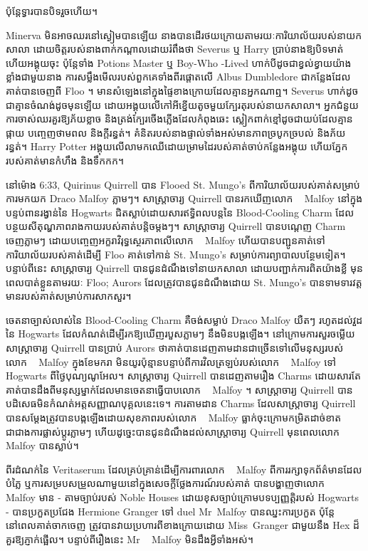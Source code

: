 {ប៉ុន្តែទ្វារបានបិទរួចហើយ។

\later

Minerva មិនអាចឈរនៅស្ងៀមបានឡើយ នាងបានដើរថយក្រោយតាមរយៈការិយាល័យរបស់នាយកសាលា ដោយចិត្តរបស់នាងពាក់កណ្តាលដោយរំពឹងថា Severus ឬ Harry ប្រាប់នាងឱ្យបិទមាត់ហើយអង្គុយចុះ ប៉ុន្តែទាំង Potions Master ឬ Boy-Who -Lived ហាក់បីដូចជាខ្វល់ខ្វាយយ៉ាងខ្លាំងជាមួយនាង ការសម្លឹងមើលរបស់ពួកគេទាំងពីរផ្តោតលើ Albus Dumbledore ជាកន្លែងដែលគាត់បានចេញពី Floo ។ មាន​សំឡេង​នៅ​ក្នុង​ផ្ទៃ​ខាងក្រោយ​ដែល​គ្មាន​អ្នក​ណា​ឮ។ Severus ហាក់​ដូច​ជា​គ្មាន​ចំណង់​ដូច​មុន​ឡើយ ដោយ​អង្គុយ​លើ​កៅអី​ខ្នើយ​តូច​មួយ​ក្បែរ​តុ​របស់​នាយក​សាលា។ អ្នកជំនួយការចាស់ឈរគួរឱ្យភ័យខ្លាច និងត្រង់ក្បែរចើងភ្លើងដែលកំពុងឆេះ ស្លៀកពាក់ខ្មៅដូចជាយប់ដែលគ្មានផ្កាយ បញ្ចេញថាមពល និងក្តីរន្ធត់។ គំនិត​របស់​នាង​ផ្ទាល់​ទាំង​អស់​មាន​ភាព​ច្របូកច្របល់ និង​ភ័យ​រន្ធត់។ Harry Potter អង្គុយលើលាមកឈើដោយម្រាមដៃរបស់គាត់ចាប់កន្លែងអង្គុយ ហើយភ្នែករបស់គាត់មានកំហឹង និងទឹកកក។

នៅម៉ោង 6:33\am, Quirinus Quirrell បាន Flooed St. Mungo's ពីការិយាល័យរបស់គាត់សម្រាប់ការមកយក Draco Malfoy ភ្លាមៗ។ សាស្ត្រាចារ្យ Quirrell បានរកឃើញលោក ~ Malfoy នៅក្នុងបន្ទប់ពានរង្វាន់នៃ Hogwarts ជិតស្លាប់ដោយសារឥទ្ធិពលបន្តនៃ Blood-Cooling Charm ដែលបន្ថយសីតុណ្ហភាពរាងកាយរបស់គាត់បន្តិចម្តងៗ។ សាស្ត្រាចារ្យ Quirrell បានបណ្តេញ Charm ចេញភ្លាមៗ ដោយបញ្ចេញអក្ខរាវិរុទ្ធស្ថេរភាពលើលោក ~ Malfoy ហើយបានបញ្ជូនគាត់ទៅការិយាល័យរបស់គាត់ដើម្បី Floo គាត់ទៅកាន់ St. Mungo's សម្រាប់ការព្យាបាលបន្ថែមទៀត។ បន្ទាប់ពីនេះ សាស្រ្តាចារ្យ Quirrell បានជូនដំណឹងទៅនាយកសាលា ដោយបញ្ជាក់ការពិតយ៉ាងខ្លី មុនពេលបាត់ខ្លួនតាមរយៈ Floo; Aurors ដែលត្រូវបានជូនដំណឹងដោយ St. Mungo's បានទាមទារវត្តមានរបស់គាត់សម្រាប់ការសាកសួរ។

ចេតនាច្បាស់លាស់នៃ Blood-Cooling Charm គឺចង់សម្លាប់ Draco Malfoy យឺតៗ រហូតដល់វួដនៃ Hogwarts ដែលកំណត់ដើម្បីរកឱ្យឃើញរបួសភ្លាមៗ នឹងមិនបង្កឡើង។ នៅក្រោមការសួរចម្លើយ សាស្រ្តាចារ្យ Quirrell បានប្រាប់ Aurors ថាគាត់បានដេញតាមដានជាច្រើនទៅលើមនុស្សរបស់លោក ~ Malfoy ក្នុងខែមករា មិនយូរប៉ុន្មានបន្ទាប់ពីការវិលត្រឡប់របស់លោក ~ Malfoy ទៅ Hogwarts ពីថ្ងៃបុណ្យណូអែល។ សាស្រ្តាចារ្យ Quirrell បានដេញតាមរឿង Charms ដោយសារតែគាត់បានដឹងពីមនុស្សម្នាក់ដែលមានចេតនាធ្វើបាបលោក ~ Malfoy ។ សាស្ត្រាចារ្យ Quirrell បានបដិសេធមិនកំណត់អត្តសញ្ញាណបុគ្គលនេះទេ។ ការតាមដាន Charms ដែលសាស្រ្តាចារ្យ Quirrell បានសម្ដែងត្រូវបានបង្កឡើងដោយសុខភាពរបស់លោក ~ Malfoy ធ្លាក់ចុះក្រោមកម្រិតដាច់ខាត ជាជាងការផ្លាស់ប្តូរភ្លាមៗ ហើយដូច្នេះបានជូនដំណឹងដល់សាស្រ្តាចារ្យ Quirrell មុនពេលលោក ~ Malfoy បានស្លាប់។

ពីរដំណក់នៃ Veritaserum ដែលគ្រប់គ្រាន់ដើម្បីការពារលោក ~ Malfoy ពីការរក្សាទុកព័ត៌មានដែលបំភ្លៃ ឬការសម្របសម្រួលណាមួយនៅក្នុងសេចក្តីថ្លែងការណ៍របស់គាត់ បានបង្ហាញថាលោក ~ Malfoy មាន - តាមច្បាប់របស់ Noble Houses ដោយខុសច្បាប់ក្រោមបទប្បញ្ញត្តិរបស់ Hogwarts - បានប្រកួតប្រជែង Hermione Granger ទៅ duel Mr~Malfoy បានឈ្នះការប្រកួត ប៉ុន្តែនៅពេលគាត់ចាកចេញ ត្រូវបានវាយប្រហារពីខាងក្រោយដោយ Miss~Granger ជាមួយនឹង Hex ដ៏គួរឱ្យភ្ញាក់ផ្អើល។ បន្ទាប់ពីរឿងនេះ Mr ~ Malfoy មិនដឹងអ្វីទាំងអស់។

}
